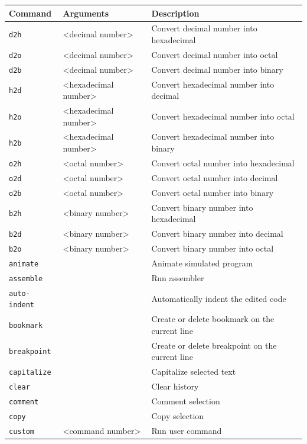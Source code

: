 \documentclass[a4paper,twoside,12pt]{book}
\newcommand{\mysmallfont}{\fontsize{8pt}{10pt} \selectfont{}}
\begin{document}
			{
			\mysmallfont{}
			\begin{longtable}{l|ll}
				\textbf{Command} & \textbf{Arguments} & \textbf{Description} \\\hline
				\endhead
				\texttt{d2h}		& <decimal number>	& Convert decimal number into hexadecimal		\\
				\texttt{d2o}		& <decimal number>	& Convert decimal number into octal			\\
				\texttt{d2b}		& <decimal number>	& Convert decimal number into binary			\\
				\texttt{h2d}		& <hexadecimal number>	& Convert hexadecimal number into decimal		\\
				\texttt{h2o}		& <hexadecimal number>	& Convert hexadecimal number into octal			\\
				\texttt{h2b}		& <hexadecimal number>	& Convert hexadecimal number into binary		\\
				\texttt{o2h}		& <octal number>	& Convert octal number into hexadecimal			\\
				\texttt{o2d}		& <octal number>	& Convert octal number into decimal			\\
				\texttt{o2b}		& <octal number>	& Convert octal number into binary			\\
				\texttt{b2h}		& <binary number>	& Convert binary number into hexadecimal		\\
				\texttt{b2d}		& <binary number>	& Convert binary number into decimal			\\
				\texttt{b2o}		& <binary number>	& Convert binary number into octal			\\
				\texttt{animate}	&			& Animate simulated program				\\
				\texttt{assemble}	&			& Run assembler						\\
				\texttt{auto-indent}	&			& Automatically indent the edited code			\\
				\texttt{bookmark}	&			& Create or delete bookmark on the current line		\\
				\texttt{breakpoint}	&			& Create or delete breakpoint on the current line	\\
				\texttt{capitalize}	&			& Capitalize selected text				\\
				\texttt{clear}		&			& Clear history						\\
				\texttt{comment}	&			& Comment selection					\\
				\texttt{copy}		&			& Copy selection					\\
				\texttt{custom}		& <command number>	& Run user command					\\

\end{longtable}}
\end{document}

